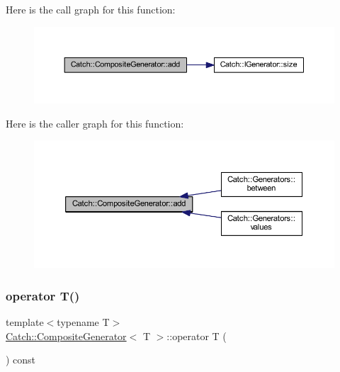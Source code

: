 Here is the call graph for this function\+:\nopagebreak
\begin{figure}[H]
\begin{center}
\leavevmode
\includegraphics[width=350pt]{class_catch_1_1_composite_generator_af3774d42ad2d3453d089ca599efe0517_cgraph}
\end{center}
\end{figure}
Here is the caller graph for this function\+:\nopagebreak
\begin{figure}[H]
\begin{center}
\leavevmode
\includegraphics[width=350pt]{class_catch_1_1_composite_generator_af3774d42ad2d3453d089ca599efe0517_icgraph}
\end{center}
\end{figure}
\hypertarget{class_catch_1_1_composite_generator_a83d6c941e2e735b9528e6e832f7b76e7}{}\label{class_catch_1_1_composite_generator_a83d6c941e2e735b9528e6e832f7b76e7} 
\subsubsection{\texorpdfstring{operator T()}{operator T()}}
{\footnotesize\ttfamily template$<$typename T$>$ \\
\hyperlink{class_catch_1_1_composite_generator}{Catch\+::\+Composite\+Generator}$<$ T $>$\+::operator T (\begin{DoxyParamCaption}{ }\end{DoxyParamCaption}) const\hspace{0.3cm}{\ttfamily [inline]}}

